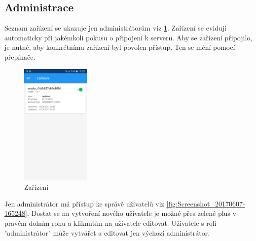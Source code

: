 \documentclass[czech,BP]{thesiskiv}
\begin{document}
\subsection{Administrace}

Seznam zařízení se ukazuje jen administrátorům viz \ref{fig:Screenshot_20170607-165221}. Zařízení se evidují automaticky při jakémkoli pokusu o připojení k serveru. Aby se zařízení připojilo, je nutné, aby konkrétnímu zařízení byl povolen přístup. Ten se mění pomocí přepínače.
\begin{figure}[H]
	\centering
	\includegraphics[width=0.3\textwidth]{../images/client_android/Screenshot_20170607-165221.png}	
	\caption{Zařízení}
	\label{fig:Screenshot_20170607-165221}
\end{figure}
Jen administrátor má přístup ke správě uživatelů viz \ref{fig:Screenshot_20170607-165248}.
Dostat se na vytvoření nového uživatele je možné přes zelené plus v pravém dolním rohu a kliknutím na uživatele editovat.
Uživatele s rolí "administrátor" může vytvářet a editovat jen výchozí administrátor.
\end{document}
